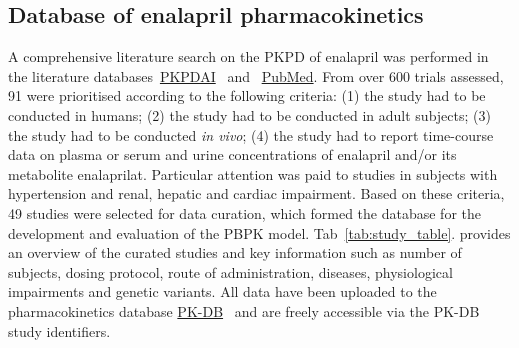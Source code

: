 \documentclass[pharmaceutics,article,submit,pdftex,moreauthors]{Definitions/mdpi}
\begin{document}
\subsection{Database of enalapril pharmacokinetics}
A comprehensive literature search on the PKPD of enalapril was performed in the literature databases~\href{https://www.pkpdai.com/}{PKPDAI}~\cite{GonzalezHernandez2021} and ~\href{https://pubmed.ncbi.nlm.nih.gov/}{PubMed}. From over 600 trials assessed, 91 were prioritised according to the following criteria: (1) the study had to be conducted in humans; (2) the study had to be conducted in adult subjects; (3) the study had to be conducted \textit{in vivo}; (4) the study had to report time-course data on plasma or serum and urine concentrations of enalapril and/or its metabolite enalaprilat. Particular attention was paid to studies in subjects with hypertension and renal, hepatic and cardiac impairment. Based on these criteria, 49 studies were selected for data curation, which formed the database for the development and evaluation of the PBPK model. 
Tab~\ref{tab:study_table}. provides an overview of the curated studies and key information such as number of subjects, dosing protocol, route of administration, diseases, physiological impairments and genetic variants. All data have been uploaded to the pharmacokinetics database \href{https://pk-db.com}{PK-DB}~\cite{Grzegorzewski2021} and are freely accessible via the PK-DB study identifiers.
\label{tab:study_table}
\end{document}
